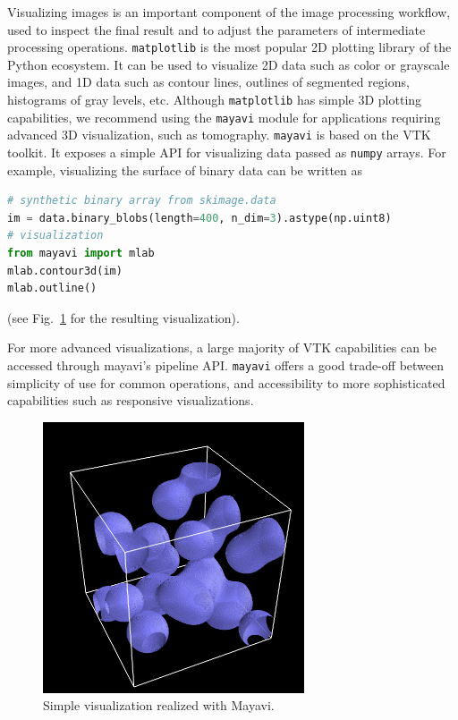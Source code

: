 \documentclass[twocolumn]{bmcart}%
\begin{document}
Visualizing images is an important component of the image processing
workflow, used to inspect the final result and to adjust the
parameters of intermediate processing operations.
\texttt{matplotlib} \citep{Hunter2007} is the most popular 2D plotting
library of the Python ecosystem. It can be used to visualize 2D data such
as color or grayscale images, and 1D data such as contour lines, outlines
of segmented regions, histograms of gray levels, etc. Although
\texttt{matplotlib} has simple 3D plotting capabilities, we
recommend using the \texttt{mayavi} module \citep{Ramachandran2011}
for applications requiring advanced 3D visualization, such as tomography. 
\texttt{mayavi} is based on the VTK toolkit. It exposes a simple API for
visualizing data passed as \texttt{numpy} arrays. For example,
visualizing the surface of binary data can be written as
\begin{lstlisting}[language=Python]
# synthetic binary array from skimage.data
im = data.binary_blobs(length=400, n_dim=3).astype(np.uint8)
# visualization
from mayavi import mlab
mlab.contour3d(im)
mlab.outline()
\end{lstlisting}
(see Fig.~\ref{fig:mayavi} for the resulting visualization).

For more advanced visualizations, a large majority of VTK capabilities
can be accessed through mayavi's pipeline API. \texttt{mayavi} offers a
good trade-off between simplicity of use for common operations, and
accessibility to more sophisticated capabilities such as responsive
visualizations.

\begin{figure}[ht]
    \centerline{\includegraphics[width=0.6\columnwidth]{mayavi_example}}
    \caption{Simple visualization realized with Mayavi.
 \label{fig:mayavi}}
\end{figure}
\end{document}
